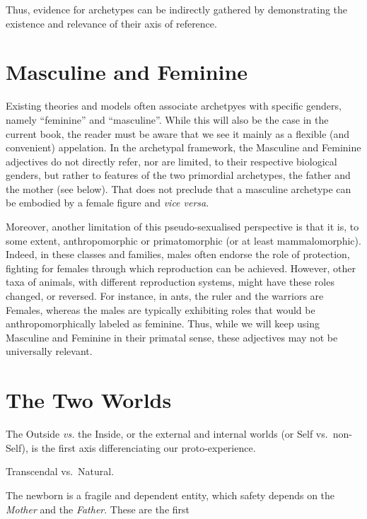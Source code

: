 \documentclass[
]{book}
\begin{document}
Thus, evidence for archetypes can be indirectly gathered by demonstrating the existence and relevance of their axis of reference.

\hypertarget{masculine-and-feminine}{%
\section{Masculine and Feminine}\label{masculine-and-feminine}}

Existing theories and models often associate archetpyes with specific genders, namely ``feminine'' and ``masculine''. While this will also be the case in the current book, the reader must be aware that we see it mainly as a flexible (and convenient) appelation. In the archetypal framework, the Masculine and Feminine adjectives do not directly refer, nor are limited, to their respective biological genders, but rather to features of the two primordial archetypes, the father and the mother (see below). That does not preclude that a masculine archetype can be embodied by a female figure and \emph{vice versa}.

Moreover, another limitation of this pseudo-sexualised perspective is that it is, to some extent, anthropomorphic or primatomorphic (or at least mammalomorphic). Indeed, in these classes and families, males often endorse the role of protection, fighting for females through which reproduction can be achieved. However, other taxa of animals, with different reproduction systems, might have these roles changed, or reversed. For instance, in ants, the ruler and the warriors are Females, whereas the males are typically exhibiting roles that would be anthropomorphically labeled as feminine. Thus, while we will keep using Masculine and Feminine in their primatal sense, these adjectives may not be universally relevant.

\hypertarget{the-two-worlds}{%
\section{The Two Worlds}\label{the-two-worlds}}

The Outside \emph{vs.} the Inside, or the external and internal worlds (or Self vs.~non-Self), is the first axis differenciating our proto-experience.

Transcendal vs.~Natural.

The newborn is a fragile and dependent entity, which safety depends on the \emph{Mother} and the \emph{Father}. These are the first
\end{document}
